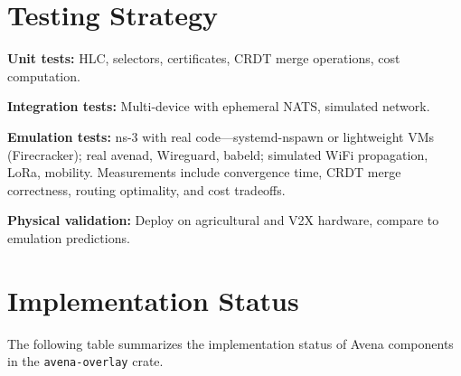 
\section{Testing Strategy}

\textbf{Unit tests:} HLC, selectors, certificates, CRDT merge operations, cost computation.

\textbf{Integration tests:} Multi-device with ephemeral NATS, simulated network.

\textbf{Emulation tests:} ns-3 with real code---systemd-nspawn or lightweight VMs (Firecracker); real avenad, Wireguard, babeld; simulated WiFi propagation, LoRa, mobility. Measurements include convergence time, CRDT merge correctness, routing optimality, and cost tradeoffs.

\textbf{Physical validation:} Deploy on agricultural and V2X hardware, compare to emulation predictions.

\section{Implementation Status}

The following table summarizes the implementation status of Avena components in the \texttt{avena-overlay} crate.

